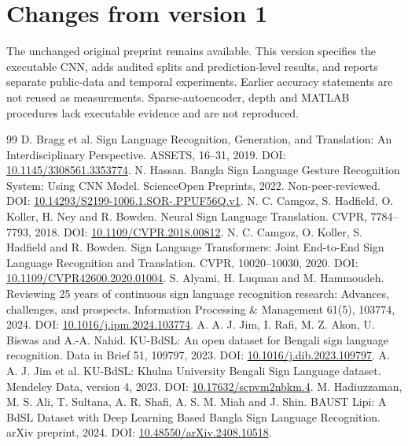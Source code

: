 \documentclass[11pt,a4paper]{article}
\begin{document}
\section{Changes from version 1}
The unchanged original preprint remains available. This version specifies the executable CNN, adds audited splits and prediction-level results, and reports separate public-data and temporal experiments. Earlier accuracy statements are not reused as measurements. Sparse-autoencoder, depth and MATLAB procedures lack executable evidence and are not reproduced.
\begin{thebibliography}{99}\small\setlength{\itemsep}{2pt}\setlength{\parskip}{0pt}
 D. Bragg et al. Sign Language Recognition, Generation, and Translation: An Interdisciplinary Perspective. ASSETS, 16--31, 2019. DOI: \href{https://doi.org/10.1145/3308561.3353774}{10.1145/3308561.3353774}.
 N. Hassan. Bangla Sign Language Gesture Recognition System: Using CNN Model. ScienceOpen Preprints, 2022. Non-peer-reviewed. DOI: \href{https://doi.org/10.14293/S2199-1006.1.SOR-.PPUF56Q.v1}{10.14293/S2199-1006.1.SOR-.PPUF56Q.v1}.
 N. C. Camgoz, S. Hadfield, O. Koller, H. Ney and R. Bowden. Neural Sign Language Translation. CVPR, 7784--7793, 2018. DOI: \href{https://doi.org/10.1109/CVPR.2018.00812}{10.1109/CVPR.2018.00812}.
 N. C. Camgoz, O. Koller, S. Hadfield and R. Bowden. Sign Language Transformers: Joint End-to-End Sign Language Recognition and Translation. CVPR, 10020--10030, 2020. DOI: \href{https://doi.org/10.1109/CVPR42600.2020.01004}{10.1109/CVPR42600.2020.01004}.
 S. Alyami, H. Luqman and M. Hammoudeh. Reviewing 25 years of continuous sign language recognition research: Advances, challenges, and prospects. Information Processing \& Management 61(5), 103774, 2024. DOI: \href{https://doi.org/10.1016/j.ipm.2024.103774}{10.1016/j.ipm.2024.103774}.
 A. A. J. Jim, I. Rafi, M. Z. Akon, U. Biswas and A.-A. Nahid. KU-BdSL: An open dataset for Bengali sign language recognition. Data in Brief 51, 109797, 2023. DOI: \href{https://doi.org/10.1016/j.dib.2023.109797}{10.1016/j.dib.2023.109797}.
 A. A. J. Jim et al. KU-BdSL: Khulna University Bengali Sign Language dataset. Mendeley Data, version 4, 2023. DOI: \href{https://doi.org/10.17632/scpvm2nbkm.4}{10.17632/scpvm2nbkm.4}.
 M. Hadiuzzaman, M. S. Ali, T. Sultana, A. R. Shafi, A. S. M. Miah and J. Shin. BAUST Lipi: A BdSL Dataset with Deep Learning Based Bangla Sign Language Recognition. arXiv preprint, 2024. DOI: \href{https://doi.org/10.48550/arXiv.2408.10518}{10.48550/arXiv.2408.10518}.

\end{thebibliography}
\end{document}
